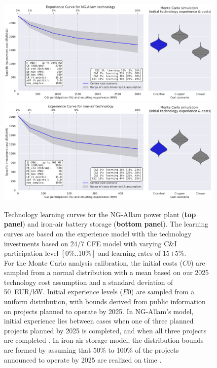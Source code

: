 \documentclass[pdflatex,sn-basic, Numbered]{sn-jnl}%
\theoremstyle{thmstyleone}%
\theoremstyle{thmstyletwo}%
\theoremstyle{thmstylethree}%
\begin{document}
\FloatBarrier
\begin{figure}[htbp]
    \centering
    \includegraphics[width=\textwidth]{images/e_curve_NG-Allam.pdf}
    \includegraphics[width=\textwidth]{images/e_curve_iron-air.pdf}
    \caption{Technology learning curves for the NG-Allam power plant (\textbf{top panel}) and iron-air battery storage (\textbf{bottom panel}).
    The learning curves are based on the experience model with the technology investments based on 24/7 CFE model with varying C\&I participation level $[0\%..10\%]$ and learning rates of 15$\pm$5\%. \\
    For the Monte Carlo analysis calibration, the initial costs ($C0$) are sampled from a normal distribution with a mean based on our 2025 technology cost assumption and a standard deviation of 50~EUR/kW. Initial experience levels ($E0$) are sampled from a uniform distribution, with bounds derived from public information on projects planned to operate by 2025. In NG-Allam's model, initial experience lies between cases when one of three planned projects planned by 2025 is completed, and when all three projects are completed \cite{BroadwingEnergyProject, CoyoteCleanPower, FrogLakeProject}. In iron-air storage model, the distribution bounds are formed by assuming that 50\% to 100\% of the projects announced to operate by 2025 are realized on time \cite{FormEnergyLatest2024}.
    }
    \label{fig:panels}
\end{figure}
\FloatBarrier
\end{document}
